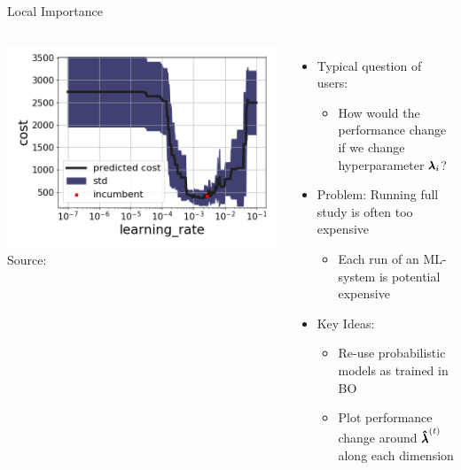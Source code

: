 \begin{frame}[c]{Local Importance }

\begin{columns}
	
	\begin{center}
		\includegraphics[width=1.0\textwidth]{images/learning_rate_lpi.png}\\
		Source: 
	\end{center}
	
	
	\begin{itemize}
		\item Typical question of users:
		\begin{itemize}
			\item How would the performance change\\
			if we change hyperparameter $\pmb{\lambda}_i$?
		\end{itemize}
        \pause 
		\item Problem: Running full study is often too expensive
		\begin{itemize}
			\item Each run of an ML-system is potential expensive
		\end{itemize}
		\pause
		\item \alert{Key Ideas:}
		\begin{itemize}
			\item Re-use probabilistic models as trained in BO
			\item Plot performance change around ${\pmb{\hat{\lambda}}}^{(t)}$\\
			 along each dimension
		\end{itemize} 
	\end{itemize}
	
\end{columns}

\end{frame}
